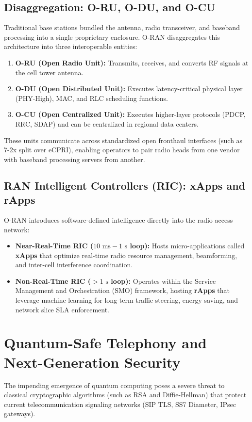 \documentclass[12pt,a4paper]{report}
\begin{document}
\subsection{Disaggregation: O-RU, O-DU, and O-CU}
Traditional base stations bundled the antenna, radio transceiver, and baseband processing into a single proprietary enclosure. O-RAN disaggregates this architecture into three interoperable entities:
\begin{enumerate}
    \item \textbf{O-RU (Open Radio Unit):} Transmits, receives, and converts RF signals at the cell tower antenna.
    \item \textbf{O-DU (Open Distributed Unit):} Executes latency-critical physical layer (PHY-High), MAC, and RLC scheduling functions.
    \item \textbf{O-CU (Open Centralized Unit):} Executes higher-layer protocols (PDCP, RRC, SDAP) and can be centralized in regional data centers.
\end{enumerate}
These units communicate across standardized open fronthaul interfaces (such as 7-2x split over eCPRI), enabling operators to pair radio heads from one vendor with baseband processing servers from another.

\subsection{RAN Intelligent Controllers (RIC): xApps and rApps}
O-RAN introduces software-defined intelligence directly into the radio access network:
\begin{itemize}
    \item \textbf{Near-Real-Time RIC ($10\text{ ms} - 1\text{ s}$ loop):} Hosts micro-applications called \textbf{xApps} that optimize real-time radio resource management, beamforming, and inter-cell interference coordination.
    \item \textbf{Non-Real-Time RIC ($>1\text{ s}$ loop):} Operates within the Service Management and Orchestration (SMO) framework, hosting \textbf{rApps} that leverage machine learning for long-term traffic steering, energy saving, and network slice SLA enforcement.
\end{itemize}

\section{Quantum-Safe Telephony and Next-Generation Security}
The impending emergence of quantum computing poses a severe threat to classical cryptographic algorithms (such as RSA and Diffie-Hellman) that protect current telecommunication signaling networks (SIP TLS, SS7 Diameter, IPsec gateways).
\end{document}
